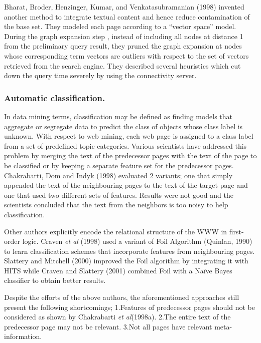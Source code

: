\documentclass{article}
\begin{document}
Bharat, Broder, Henzinger, Kumar, and Venkatasubramanian (1998) invented another method to integrate textual content and hence reduce contamination of the base set. They modeled each page according to a “vector space” model. During the graph expansion step , instead of  including all nodes at distance 1 from the preliminary query result, they pruned the graph expansion at nodes whose corresponding term vectors are outliers with respect to the set of vectors retrieved from the search engine. They described several heuristics which cut down the query time severely by using the connectivity server. 
\subsubsection{ Automatic classification.}
In data mining terms, classification may be defined as finding models that aggregate or segregate data to predict the class of objects whose class label is unknown. With respect to web mining, each web page is assigned to a class label from a set of predefined topic categories. Various scientists have addressed this problem by merging the text of the predecessor pages with the text of the page to be classified or by keeping a separate feature set for the predecessor pages. Chakrabarti, Dom and Indyk (1998) evaluated 2 variants; one that simply appended the text  of the neighbouring pages to the text of the target page and one that used two different sets of features. Results were not good and the scientists concluded that the text from the neighbors is too noisy to help classification.

 Other authors explicitly encode the relational structure of the WWW in first-order logic. Craven \textit{et al} (1998) used a variant of Foil Algorithm (Quinlan, 1990) to learn classification schemes that incorporate features from neighbouring pages. Slattery and Mitchell (2000) improved the Foil algorithm by integrating it with HITS while Craven and Slattery (2001) combined Foil with a Naïve Bayes classifier to obtain better results.

Despite the efforts of the above authors, the aforementioned approaches still present the following shortcomings;
\newline 1.Features of predecessor pages should not be considered as shown by Chakrabarti \textit{et al}(1998a).
\newline 2.The entire text of the predecessor page may not be relevant.
\newline 3.Not all pages have relevant meta-information.
\end{document}
